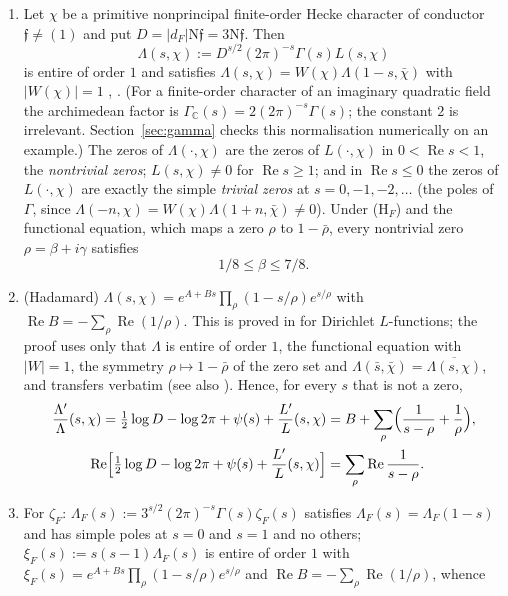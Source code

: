 \documentclass[11pt]{article}
\theoremstyle{definition}
\theoremstyle{remark}
\numberwithin{equation}{section}
\newcommand{\C}{\mathbb C}
\newcommand{\ff}{\mathfrak f}
\newcommand{\Nm}{\mathrm N}
\newcommand{\Rea}{\operatorname{Re}}
\newcommand{\HF}{\textup{(H$_F$)}}
\begin{document}
\begin{enumerate}
\item[(S1)] Let $\chi$ be a primitive nonprincipal finite-order Hecke character of conductor $\ff\ne(1)$ and put $D=|d_F|\Nm\ff=3\Nm\ff$. Then
\[
 \Lambda(s,\chi):=D^{s/2}(2\pi)^{-s}\Gamma(s)L(s,\chi)
\]
is entire of order $1$ and satisfies $\Lambda(s,\chi)=W(\chi)\Lambda(1-s,\bar\chi)$ with $|W(\chi)|=1$ \cite[Chapter~VII, \S8]{neukirch1999}, \cite[Chapter~5]{ik2004}. (For a finite-order character of an imaginary quadratic field the archimedean factor is $\Gamma_\C(s)=2(2\pi)^{-s}\Gamma(s)$; the constant $2$ is irrelevant. Section~\ref{sec:gamma} checks this normalisation numerically on an example.) The zeros of $\Lambda(\cdot,\chi)$ are the zeros of $L(\cdot,\chi)$ in $0<\Rea s<1$, the \emph{nontrivial zeros}; $L(s,\chi)\ne0$ for $\Rea s\ge1$; and in $\Rea s\le0$ the zeros of $L(\cdot,\chi)$ are exactly the simple \emph{trivial zeros} at $s=0,-1,-2,\ldots$ (the poles of $\Gamma$, since $\Lambda(-n,\chi)=W(\chi)\Lambda(1+n,\bar\chi)\ne0$). Under \HF{} and the functional equation, which maps a zero $\rho$ to $1-\bar\rho$, every nontrivial zero $\rho=\beta+i\gamma$ satisfies
\begin{equation}\label{eq:strip}
 1/8\le\beta\le7/8 .
\end{equation}
\item[(S2)] (Hadamard) $\Lambda(s,\chi)=e^{A+Bs}\prod_\rho(1-s/\rho)e^{s/\rho}$ with $\Rea B=-\sum_\rho\Rea(1/\rho)$. This is proved in \cite[Chapter~12]{davenport2000} for Dirichlet $L$-functions; the proof uses only that $\Lambda$ is entire of order $1$, the functional equation with $|W|=1$, the symmetry $\rho\mapsto1-\bar\rho$ of the zero set and $\Lambda(\bar s,\bar\chi)=\overline{\Lambda(s,\chi)}$, and transfers verbatim (see also \cite[Chapter~5]{ik2004}). Hence, for every $s$ that is not a zero,
\begin{align}
 \frac{\Lambda'}{\Lambda}(s,\chi)=\tfrac12\log D-\log2\pi+\psi(s)+\frac{L'}{L}(s,\chi)&=B+\sum_\rho\Bigl(\frac1{s-\rho}+\frac1\rho\Bigr),\label{eq:hadamard}\\
 \Rea\Bigl[\tfrac12\log D-\log2\pi+\psi(s)+\frac{L'}{L}(s,\chi)\Bigr]&=\sum_\rho\Rea\frac1{s-\rho}.\label{eq:realpart}
\end{align}
\item[(S3)] For $\zeta_F$: $\Lambda_F(s):=3^{s/2}(2\pi)^{-s}\Gamma(s)\zeta_F(s)$ satisfies $\Lambda_F(s)=\Lambda_F(1-s)$ and has simple poles at $s=0$ and $s=1$ and no others; $\xi_F(s):=s(s-1)\Lambda_F(s)$ is entire of order $1$ with $\xi_F(s)=e^{A+Bs}\prod_\rho(1-s/\rho)e^{s/\rho}$ and $\Rea B=-\sum_\rho\Rea(1/\rho)$, whence

\end{enumerate}
\end{document}
